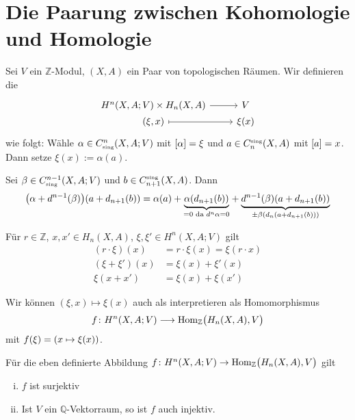 \section{Die Paarung zwischen Kohomologie und Homologie} %
\label{sec:2}

\begin{definition}[{name=[Paarung]}]
	Sei $V$ ein $\mathbb{Z}$-Modul, $(X,A)$ ein Paar von topologischen Räumen. Wir definieren die 
	\[
		\begin{tikzcd}[row sep=0cm]
			H^n(X,A;V) \times H_n(X,A) \rar & V \\
			(\xi, x) \rar[mapsto] & \xi(x)
		\end{tikzcd}
	\]
	wie folgt: Wähle $\alpha \in C^n_\sing(X,A;V)$ mit $\benbrace*{\alpha}=\xi$ und $a \in C^\sing_n(X,A)$ mit $\benbrace*{a}=x$. Dann setze $\xi(x) := \alpha(a)$.
\end{definition}

\begin{bemerkung}
	Sei $\beta \in C^{n-1}_\sing(X,A;V)$ und $b \in C^\sing_{n+1}(X,A)$. Dann 
	\begin{align}
		\enbrace*{\alpha + d^{n-1}(\beta)}(a + d_{n+1}(b)) = \alpha(a) + \Underbrace{\alpha \enbrace*{d_{n+1}(b)}}{=0 \text{ da } d^n \alpha=0 } + \Underbrace{d^{n-1}(\beta) \enbrace*{a + d_{n+1}(b)}}{\pm \beta \enbrace*{d_n(a + d_{n+1}(b))}} 
	\end{align}
\end{bemerkung}

\begin{bemerkung}
	Für $r \in \mathbb{Z}$, $x,x' \in H_n(X,A)$, $\xi,\xi' \in H^n(X,A;V)$ gilt
	\begin{align}
		(r \cdot \xi)(x) &= r \cdot \xi(x) = \xi(r \cdot x) \\
		(\xi +\xi')(x) &= \xi(x) + \xi'(x) \\
		\xi(x+x')&= \xi(x) + \xi(x')
	\end{align}
\end{bemerkung}

\begin{bemerkung}
	Wir können $(\xi,x)\mapsto \xi(x)$ auch als interpretieren als Homomorphismus
	\[
		f \colon H^n(X,A;V) \longrightarrow \Hom_\mathbb{Z} \enbrace[\big]{H_n(X,A),V}
	\]
	mit $f(\xi)= \enbrace*{x \mapsto \xi(x)}$.
\end{bemerkung}

\begin{satz}
	Für die eben definierte Abbildung $f \colon H^n(X,A;V) \to \Hom_\mathbb{Z} \enbrace[\big]{H_n(X,A),V}$ gilt
	\begin{enumerate}[(i)]
		\item $f$ ist surjektiv
		\item Ist $V$ ein $\mathbb{Q}$-Vektorraum, so ist $f$ auch injektiv.
	\end{enumerate}
\end{satz}

